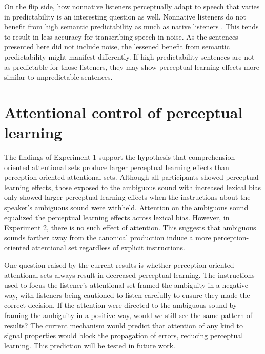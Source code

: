 On the flip side, how nonnative listeners perceptually adapt to speech that varies in predictability is an interesting question as well.
Nonnative listeners do not benefit from high semantic predictability as much as native listeners \citep{Mayo1997}.
This tends to result in less accuracy for transcribing speech in noise.
As the sentences presented here did not include noise, the lessened benefit from semantic predictability might manifest differently.
If high predictability sentences are not as predictable for those listeners, they may show perceptual learning effects more similar to unpredictable sentences.


\section{Attentional control of perceptual learning}

The findings of Experiment 1 support the hypothesis that comprehension-oriented attentional sets produce larger perceptual learning effects than perception-oriented attentional sets.  
Although all participants showed perceptual learning effects, those exposed to the ambiguous sound with increased lexical bias only showed larger perceptual learning effects when the instructions about the speaker's ambiguous sound were withheld.  
Attention on the ambiguous sound equalized the perceptual learning effects across lexical bias.
However, in Experiment 2, there is no such effect of attention.
This suggests that ambiguous sounds farther away from the canonical production induce a more perception-oriented attentional set regardless of explicit instructions.

One question raised by the current results is whether perception-oriented attentional sets always result in decreased perceptual learning.  
The instructions used to focus the listener's attentional set framed the ambiguity in a negative way, with listeners being cautioned to listen carefully to ensure they made the correct decision.  
If the attention were directed to the ambiguous sound by framing the ambiguity in a positive way, would we still see the same pattern of results?
The current mechanism would predict that attention of any kind to signal properties would block the propagation of errors, reducing perceptual learning.
This prediction will be tested in future work.

